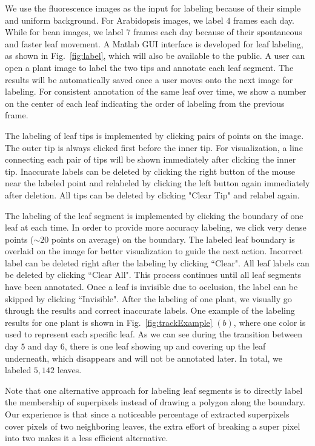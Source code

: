 We use the fluorescence images as the input for labeling because of their simple and uniform background.
For Arabidopsis images, we label $4$ frames each day.
While for bean images, we label $7$ frames each day because of their spontaneous and faster leaf movement.
A Matlab GUI interface is developed for leaf labeling, as shown in Fig.~\ref{fig:label}, which will also be available to the public.
A user can open a plant image to label the two tips and annotate each leaf segment.
The results will be automatically saved once a user moves onto the next image for labeling.
For consistent annotation of the same leaf over time, we show a number on the center of each leaf indicating the order of labeling from the previous frame.

The labeling of leaf tips is implemented by clicking pairs of points on the image.
The outer tip is always clicked first before the inner tip.
For visualization, a line connecting each pair of tips will be shown immediately after clicking the inner tip.
Inaccurate labels can be deleted by clicking the right button of the mouse near the labeled point and relabeled by clicking the left button again immediately after deletion.
All tips can be deleted by clicking "Clear Tip" and relabel again. 

The labeling of the leaf segment is implemented by clicking the boundary of one leaf at each time.
In order to provide more accuracy labeling, we click very dense points ($\sim20$ points on average) on the boundary.
The labeled leaf boundary is overlaid on the image for better visualization to guide the next action.
Incorrect label can be deleted right after the labeling by clicking ``Clear".
All leaf labels can be deleted by clicking ``Clear All".
This process continues until all leaf segments have been annotated.
Once a leaf is invisible due to occlusion, the label can be skipped by clicking ``Invisible". 
After the labeling of one plant, we visually go through the results and correct inaccurate labels.
One example of the labeling results for one plant is shown in Fig.~\ref{fig:trackExample} $(b)$, where one color is used to represent each specific leaf.
As we can see during the transition between day $5$ and day $6$, there is one leaf showing up and covering up the leaf underneath, which disappears and will not be annotated later.
In total, we labeled $5,142$ leaves.

Note that one alternative approach for labeling leaf segments is to directly label the membership of superpixels instead of drawing a polygon along the boundary.
Our experience is that since a noticeable percentage of extracted superpixels cover pixels of two neighboring leaves, the extra effort of breaking a super pixel into two makes it a less efficient alternative.


